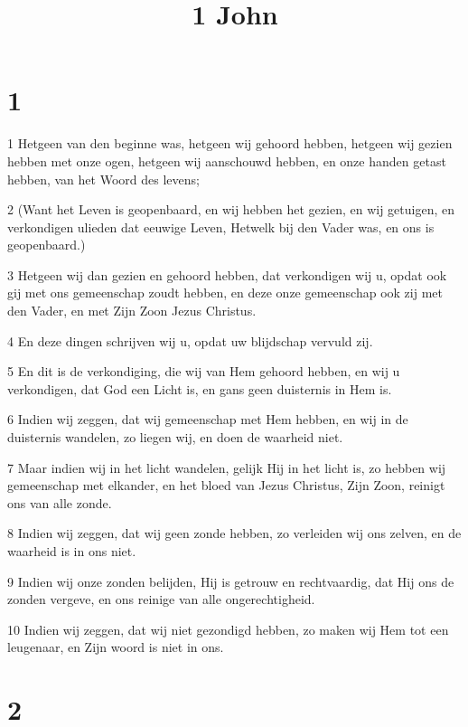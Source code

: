 

\title{1 John}



\chapter{1}

\par 1 Hetgeen van den beginne was, hetgeen wij gehoord hebben, hetgeen wij gezien hebben met onze ogen, hetgeen wij aanschouwd hebben, en onze handen getast hebben, van het Woord des levens;
\par 2 (Want het Leven is geopenbaard, en wij hebben het gezien, en wij getuigen, en verkondigen ulieden dat eeuwige Leven, Hetwelk bij den Vader was, en ons is geopenbaard.)
\par 3 Hetgeen wij dan gezien en gehoord hebben, dat verkondigen wij u, opdat ook gij met ons gemeenschap zoudt hebben, en deze onze gemeenschap ook zij met den Vader, en met Zijn Zoon Jezus Christus.
\par 4 En deze dingen schrijven wij u, opdat uw blijdschap vervuld zij.
\par 5 En dit is de verkondiging, die wij van Hem gehoord hebben, en wij u verkondigen, dat God een Licht is, en gans geen duisternis in Hem is.
\par 6 Indien wij zeggen, dat wij gemeenschap met Hem hebben, en wij in de duisternis wandelen, zo liegen wij, en doen de waarheid niet.
\par 7 Maar indien wij in het licht wandelen, gelijk Hij in het licht is, zo hebben wij gemeenschap met elkander, en het bloed van Jezus Christus, Zijn Zoon, reinigt ons van alle zonde.
\par 8 Indien wij zeggen, dat wij geen zonde hebben, zo verleiden wij ons zelven, en de waarheid is in ons niet.
\par 9 Indien wij onze zonden belijden, Hij is getrouw en rechtvaardig, dat Hij ons de zonden vergeve, en ons reinige van alle ongerechtigheid.
\par 10 Indien wij zeggen, dat wij niet gezondigd hebben, zo maken wij Hem tot een leugenaar, en Zijn woord is niet in ons.

\chapter{2}


